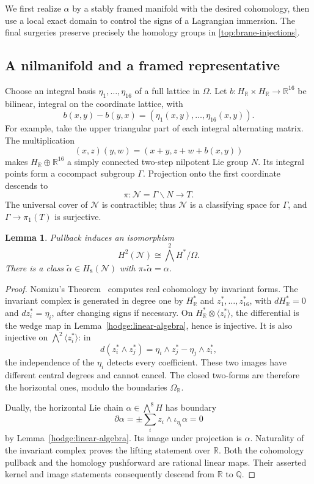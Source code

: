 \documentclass[11pt]{article}
\newtheorem{lemma}[theorem]{Lemma}
\theoremstyle{definition}
\theoremstyle{remark}
\newcommand{\Q}{\mathbb Q}
\newcommand{\R}{\mathbb R}
\numberwithin{equation}{section}
\begin{document}
We first realize $\alpha$ by a stably framed manifold with the desired
cohomology, then use a local exact domain to control the signs of a
Lagrangian immersion.  The final surgeries preserve precisely the
homology groups in \eqref{top:brane-injections}.

\subsection{A nilmanifold and a framed representative}

Choose an integral basis $\eta_1,\ldots,\eta_{16}$ of a full lattice in
$\Omega$.  Let $b:H_{\R}\times H_{\R}\to\R^{16}$ be bilinear,
integral on the coordinate lattice, with
\[
 b(x,y)-b(y,x)=(\eta_1(x,y),\ldots,\eta_{16}(x,y)).
\]
For example, take the upper triangular part of each integral alternating
matrix.  The multiplication
\[
 (x,z)(y,w)=(x+y,z+w+b(x,y))
\]
makes $H_{\R}\oplus\R^{16}$ a simply connected two-step nilpotent
Lie group $N$.  Its integral points form a cocompact subgroup $\Gamma$.
Projection onto the first coordinate descends to
\[
 \pi:\mathcal N=\Gamma\backslash N\longrightarrow T.
\]
The universal cover of $\mathcal N$ is contractible; thus
$\mathcal N$ is a classifying space for $\Gamma$, and
$\Gamma\to\pi_1(T)$ is surjective.

\begin{lemma}\label{top:nilmanifold}
Pullback induces an isomorphism
\[
 H^2(\mathcal N)\cong \bigwedge^2 H^*/\Omega.
\]
There is a class $\widetilde\alpha\in H_8(\mathcal N)$ with
$\pi_*\widetilde\alpha=\alpha$.
\end{lemma}

\begin{proof}
Nomizu's Theorem~\cite[Theorem~1]{nomizu} computes real cohomology by
invariant forms.  The invariant complex is generated in degree one by
$H^*_{\R}$ and $z_1^*,\ldots,z_{16}^*$, with
$dH^*_{\R}=0$ and $dz_i^*=\eta_i$, after changing signs if necessary.
On $H^*_{\R}\otimes\langle z_i^*\rangle$, the differential is the
wedge map in Lemma~\ref{hodge:linear-algebra}, hence is injective.
It is also injective on $\bigwedge^2\langle z_i^*\rangle$: in
\[
 d(z_i^*\wedge z_j^*)=\eta_i\wedge z_j^*-\eta_j\wedge z_i^*,
\]
the independence of the $\eta_i$ detects every coefficient.  These two
images have different central degrees and cannot cancel.  The closed
two-forms are therefore the horizontal ones, modulo the boundaries
$\Omega_{\R}$.

Dually, the horizontal Lie chain $\alpha\in\bigwedge^8H$ has boundary
\[
 \partial\alpha=\pm\sum_i z_i\wedge\iota_{\eta_i}\alpha=0
\]
by Lemma~\ref{hodge:linear-algebra}.  Its image under projection is
$\alpha$.  Naturality of the invariant complex proves the lifting
statement over $\R$.  Both the cohomology pullback and the homology
pushforward are rational linear maps.  Their asserted kernel and image
statements consequently descend from $\R$ to $\Q$.
\end{proof}
\end{document}
